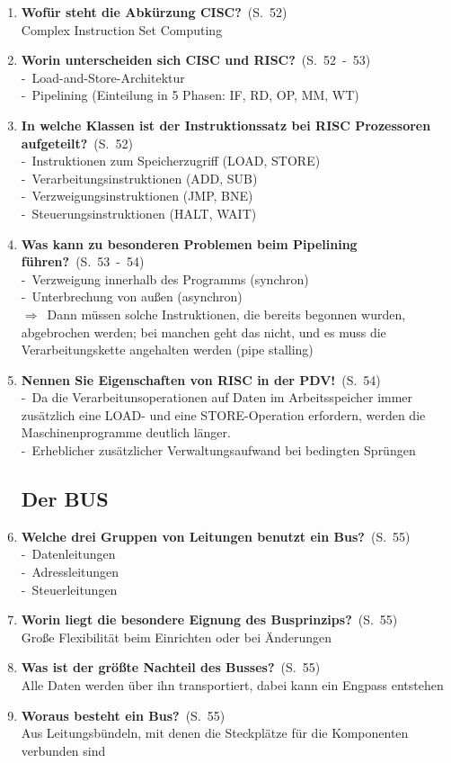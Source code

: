 \documentclass[a4paper,12pt]{article}
\newcommand{\question}[3]{\pagebreak[3]\item {\textbf{#1?}}\ (S.\ #2)#3}
\newcommand{\statement}[3]{\pagebreak[3]\item {\textbf{#1!}}\ (S.\ #2)#3}
\newcommand{\catchword}[1]{\\-\ #1}
\newcommand{\normaltext}[1]{\\#1}
\newcommand{\result}[1]{\\$\Rightarrow$\ #1}
\newcommand{\page}[1]{#1}
\newcommand{\pages}[2]{#1\ -\ #2}
\begin{document}
\begin{enumerate}
  \question{Wofür steht die Abkürzung CISC}{\page{52}}
  {
    \normaltext{Complex Instruction Set Computing}
  }

  \question{Worin unterscheiden sich CISC und RISC}{\pages{52}{53}}
  {
    \catchword{Load-and-Store-Architektur}
    \catchword{Pipelining (Einteilung in 5 Phasen: IF, RD, OP, MM, WT)}
  }

  \question{In welche Klassen ist der Instruktionssatz bei RISC Prozessoren aufgeteilt}{\page{52}}
  {
    \catchword{Instruktionen zum Speicherzugriff (LOAD, STORE)}
    \catchword{Verarbeitungsinstruktionen (ADD, SUB)}
    \catchword{Verzweigungsinstruktionen (JMP, BNE)}
    \catchword{Steuerungsinstruktionen (HALT, WAIT)}
  }

  \question{Was kann zu besonderen Problemen beim Pipelining führen}{\pages{53}{54}}
  {
    \catchword{Verzweigung innerhalb des Programms (synchron)}
    \catchword{Unterbrechung von außen (asynchron)}
    \result{Dann müssen solche Instruktionen, die bereits begonnen wurden, abgebrochen
            werden; bei manchen geht das nicht, und es muss die Verarbeitungskette angehalten
            werden (pipe stalling)}
  }

  \statement{Nennen Sie Eigenschaften von RISC in der PDV}{\page{54}}
  {
    \catchword{Da die Verarbeitunsoperationen auf Daten im Arbeitsspeicher immer zusätzlich
               eine LOAD- und eine STORE-Operation erfordern, werden die Maschinenprogramme
               deutlich länger.}
    \catchword{Erheblicher zusätzlicher Verwaltungsaufwand bei bedingten Sprüngen}
  }

  \subsection{Der BUS}

  \question{Welche drei Gruppen von Leitungen benutzt ein Bus}{\page{55}}
  {
    \catchword{Datenleitungen}
    \catchword{Adressleitungen}
    \catchword{Steuerleitungen}
  }

  \question{Worin liegt die besondere Eignung des Busprinzips}{\page{55}}
  {
    \normaltext{Große Flexibilität beim Einrichten oder bei Änderungen}
  }

  \question{Was ist der größte Nachteil des Busses}{\page{55}}
  {
    \normaltext{Alle Daten werden über ihn transportiert, dabei kann ein Engpass entstehen}
  }

  \question{Woraus besteht ein Bus}{\page{55}}
  {
    \normaltext{Aus Leitungsbündeln, mit denen die Steckplätze für die Komponenten verbunden sind}
  }


\end{enumerate}
\end{document}
